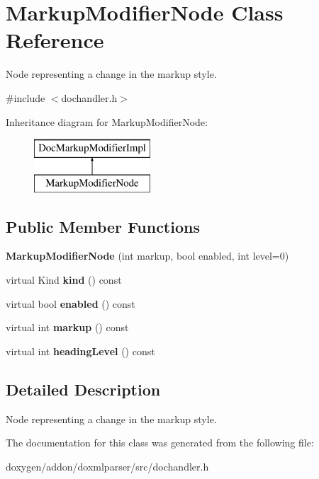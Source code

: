 \hypertarget{class_markup_modifier_node}{}\section{Markup\+Modifier\+Node Class Reference}
\label{class_markup_modifier_node}


Node representing a change in the markup style.  




{\ttfamily \#include $<$dochandler.\+h$>$}

Inheritance diagram for Markup\+Modifier\+Node\+:\begin{figure}[H]
\begin{center}
\leavevmode
\includegraphics[height=2.000000cm]{class_markup_modifier_node}
\end{center}
\end{figure}
\subsection*{Public Member Functions}
\begin{DoxyCompactItemize}
\item 
\mbox{\label{class_markup_modifier_node_a2e4736718c7f7342818ba8b027ebe74c}} 
{\bfseries Markup\+Modifier\+Node} (int markup, bool enabled, int level=0)
\item 
\mbox{\label{class_markup_modifier_node_a15d515bec5ec6a91acdc3ffde66d5194}} 
virtual Kind {\bfseries kind} () const
\item 
\mbox{\label{class_markup_modifier_node_ada8e8656293d9bfe36117eabbe6af487}} 
virtual bool {\bfseries enabled} () const
\item 
\mbox{\label{class_markup_modifier_node_a2dda28d5b7f4ad0a742890faedf272f2}} 
virtual int {\bfseries markup} () const
\item 
\mbox{\label{class_markup_modifier_node_ad5e4801bee2cfd0aa73659d26319e6da}} 
virtual int {\bfseries heading\+Level} () const
\end{DoxyCompactItemize}


\subsection{Detailed Description}
Node representing a change in the markup style. 



The documentation for this class was generated from the following file\+:\begin{DoxyCompactItemize}
\item 
doxygen/addon/doxmlparser/src/dochandler.\+h\end{DoxyCompactItemize}
